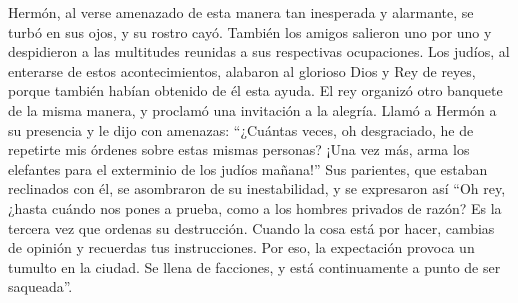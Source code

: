  Hermón, al verse amenazado de esta manera tan inesperada
y alarmante, se turbó en sus ojos, y su rostro cayó. 
También los amigos salieron uno por uno y despidieron a las multitudes
reunidas a sus respectivas ocupaciones.  Los judíos, al
enterarse de estos acontecimientos, alabaron al glorioso Dios y Rey de
reyes, porque también habían obtenido de él esta ayuda. 
El rey organizó otro banquete de la misma manera, y proclamó una
invitación a la alegría.  Llamó a Hermón a su presencia y
le dijo con amenazas: ``¿Cuántas veces, oh desgraciado, he de repetirte
mis órdenes sobre estas mismas personas?  ¡Una vez más,
arma los elefantes para el exterminio de los judíos mañana!''
 Sus parientes, que estaban reclinados con él, se
asombraron de su inestabilidad, y se expresaron así  ``Oh
rey, ¿hasta cuándo nos pones a prueba, como a los hombres privados de
razón? Es la tercera vez que ordenas su destrucción. Cuando la cosa está
por hacer, cambias de opinión y recuerdas tus instrucciones.
 Por eso, la expectación provoca un tumulto en la ciudad.
Se llena de facciones, y está continuamente a punto de ser saqueada''.

